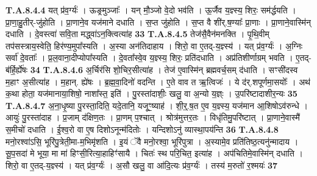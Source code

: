\documentclass[17pt]{extarticle}
\begin{document}
                  \newline
                                                                  \textbf{ T.A.8.4.4} \newline
                  यत् प्र॑व॒र्ग्यः॑ । ऊङ्र्मुञ्जाः᳚ । यन् मौ॒ञ्जो वे॒दो भव॑ति । ऊ॒र्जैव य॒ज्ञ्स्य॒ शिरः॒ सम॑र्द्धयति । प्रा॒णा॒हु॒तीर्-जु॑होति । प्रा॒णाने॒व यज॑माने दधाति । स॒प्त जु॑होति । स॒प्त वै शी॑र्.ष॒ण्याः᳚ प्रा॒णाः । प्रा॒णाने॒वास्मि॑न् दधाति । दे॒वस्त्वा॑ सवि॒ता मद्ध्वा॑ऽन॒क्त्वित्या॑ह \textbf{ 33} \newline
                  \newline
                                                                  \textbf{ T.A.8.4.5} \newline
                  तेज॑सै॒वैन॑मनक्ति । पृ॒थि॒वीम् तप॑सस्त्राय॒स्वेति॒ हिर॑ण्य॒मुपा᳚स्यति । अ॒स्या अन॑तिदाहाय । शिरो॒ वा ए॒तद्-य॒ज्ञ्स्य॑ । यत् प्र॑व॒र्ग्यः॑ । अ॒ग्निः सर्वा॑ दे॒वताः᳚ । प्र॒ल॒वाना॒दीप्योपा᳚स्यति । दे॒वता᳚स्वे॒व य॒ज्ञ्स्य॒ शिरः॒ प्रति॑दधाति । अप्र॑तिशीर्णाग्रम् भवति ।  ए॒तद्-ब॑र्हि॒र्ह्ये॑षः \textbf{ 34} \newline
                  \newline
                                                                  \textbf{ T.A.8.4.6} \newline
                  अ॒र्चिर॑सि शो॒चिर॒सीत्या॑ह । तेज॑ ए॒वास्मि॑न् ब्रह्मवर्च॒सम् द॑धाति । सꣳसी॑दस्व म॒हाꣳ अ॒सीत्या॑ह । म॒हान्. ह्ये॑षः । ब्र॒ह्म॒वा॒दिनो॑ वदन्ति ।  ए॒ते वाव त ऋ॒त्विजः॑ । ये द॑र्.शपूर्णमा॒सयोः᳚ ।  अथ॑ क॒था होता॒ यज॑मानाया॒शिषो॒ नाशा᳚स्त॒ इति॑ ।  पु॒रस्ता॑दाशीः॒ खलु॒ वा अ॒न्यो य॒ज्ञ्ः । उ॒परि॑ष्टादाशीर॒न्यः \textbf{ 35} \newline
                  \newline
                                                                  \textbf{ T.A.8.4.7} \newline
                  अ॒ना॒धृ॒ष्या पु॒रस्ता॒दिति॒ यदे॒तानि॒ यजूꣳ॒॒ष्याह॑ । शी॒र्॒.ष॒त ए॒व य॒ज्ञ्स्य॒ यज॑मान आ॒शिषोऽव॑रुन्धे । आयुः॑ पु॒रस्ता॑दाह । प्र॒जाम् द॑क्षिण॒तः । प्रा॒णम् प॒श्चात् ।  श्रोत्र॑मुत्तर॒तः । विधृ॑तिमु॒परि॑ष्टात् । प्रा॒णाने॒वास्मै॑ स॒मीचो॑ दधाति ।  ई॒श्व॒रो वा ए॒ष दिशोऽनून्म॑दितोः ।  यन्दिशोऽनु॑ व्यास्था॒पय॑न्ति \textbf{ 36} \newline
                  \newline
                                                                  \textbf{ T.A.8.4.8} \newline
                  मनो॒रश्वा॑ऽसि॒ भूरि॑पु॒त्रेती॒मा-म॒भिमृ॑शति ।  इ॒यं ॅवै मनो॒रश्वा॒ भूरि॑पुत्रा । अ॒स्यामे॒व प्रति॑तिष्ठ॒त्यनु॑न्मादाय । सू॒प॒सदा॑ मे भूया॒ मा मा॑ हिꣳसी॒रित्या॒हाहिꣳ॑सायै ।  चितः॑ स्थ परि॒चित॒ इत्या॑ह । अप॑चितिमे॒वास्मि॑न् दधाति । शिरो॒ वा ए॒तद्-य॒ज्ञ्स्य॑ । यत् प्र॑व॒र्ग्यः॑ ।  अ॒सौ खलु॒ वा आ॑दि॒त्यः प्र॑व॒र्ग्यः॑ । तस्य॑ म॒रुतो॑ र॒श्मयः॑ \textbf{ 37} \newline
\end{document}
